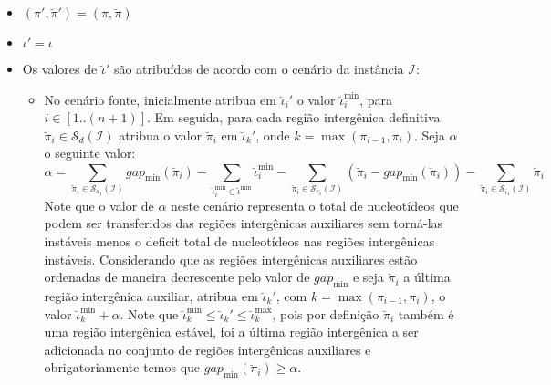 \begin{itemize}
  \item $(\pi',\breve\pi') = (\pi,\breve\pi)$
  \item $\iota' = \iota$
  \item Os valores de $\breve\iota'$ são atribuídos de acordo com o cenário da instância $\mathcal{I}$:
  \begin{itemize}
    \item No cenário fonte, inicialmente atribua em $\breve\iota_{i}'$ o valor $\breve\iota^{\min}_i$, para $i \in [1..({n+1})]$. Em seguida, para cada região intergênica definitiva $\breve\pi_i \in \mathcal{S}_{d}(\mathcal{I})$ atribua o valor $\breve\pi_i$ em $\breve\iota_{k}'$, onde $k = \max(\pi_{i-1},\pi_i)$. Seja $\alpha$ o seguinte valor:
    $$\alpha = \sum_{\breve\pi_i \in \mathcal{S}_{a_{1}}(\mathcal{I})} gap_{\min}(\breve\pi_i) - \sum_{\breve\iota_{i}^{\min}  \in \breve\iota^{\min}} \breve\iota_{i}^{\min} - \sum_{\breve\pi_i \in \mathcal{S}_{e_{1}}(\mathcal{I})} (\breve\pi_i - gap_{\min}(\breve\pi_i)) - \sum_{\breve\pi_i \in \mathcal{S}_{i_{1}}(\mathcal{I})} \breve\pi_i$$
    Note que o valor de $\alpha$ neste cenário representa o total de nucleotídeos que podem ser transferidos das regiões intergênicas auxiliares sem torná-las instáveis menos o deficit total de nucleotídeos nas regiões intergênicas instáveis. Considerando que as regiões intergênicas auxiliares estão ordenadas de maneira decrescente pelo valor de $gap_{\min}$ e seja $\breve\pi_i$ a última região intergênica auxiliar, atribua em $\breve\iota_{k}'$, com $k = \max(\pi_{i-1},\pi_i)$, o valor $\breve\iota^{\min}_k + \alpha$. Note que $\breve\iota^{\min}_k \le \breve\iota_{k}' \le \breve\iota^{\max}_k$, pois por definição $\breve\pi_i$ também é uma região intergênica estável, foi a última região intergênica a ser adicionada no conjunto de regiões intergênicas auxiliares e obrigatoriamente temos que $gap_{\min}(\breve\pi_i) \ge \alpha$.


\end{itemize}
\end{itemize}
